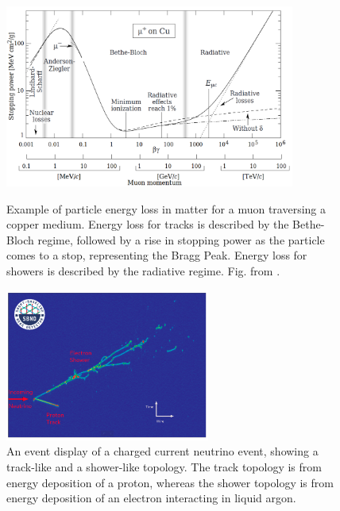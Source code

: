 \begin{figure}[htbp] 
\centering    
\includegraphics[width=0.85\textwidth]{BetheBloch}
\caption[BetheBloch]{
Example of particle energy loss in matter for a muon traversing a copper medium.
Energy loss for tracks is described by the Bethe-Bloch regime, followed by a rise in stopping power as the particle comes to a stop, representing the Bragg Peak.
Energy loss for showers is described by the radiative regime.
Fig. from \cite{Passage}.
}
\label{fig:BetheBloch}

\hfill
\break
\centering    
\includegraphics[width=0.6\textwidth]{temp}
\caption[track_shower]{
An event display of a charged current neutrino event, showing a track-like and a shower-like topology.
The track topology is from energy deposition of a proton, whereas the shower topology is from energy deposition of an electron interacting in liquid argon.
}
\label{fig:track_shower}
\end{figure}

